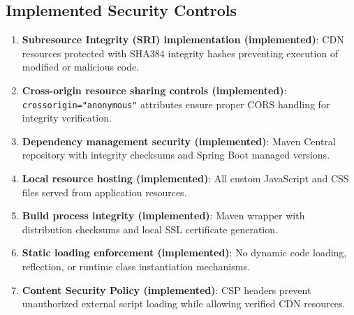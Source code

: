 \documentclass[]{UCD_CS_FYP_Report}
\begin{document}
\subsection{Implemented Security Controls}
\begin{enumerate}
	\item \textbf{Subresource Integrity (SRI) implementation (implemented)}: CDN resources protected with SHA384 integrity hashes preventing execution of modified or malicious code.
	\item \textbf{Cross-origin resource sharing controls (implemented)}: \texttt{crossorigin="anonymous"} attributes ensure proper CORS handling for integrity verification.
	\item \textbf{Dependency management security (implemented)}: Maven Central repository with integrity checksums and Spring Boot managed versions.
	\item \textbf{Local resource hosting (implemented)}: All custom JavaScript and CSS files served from application resources.
	\item \textbf{Build process integrity (implemented)}: Maven wrapper with distribution checksums and local SSL certificate generation.
	\item \textbf{Static loading enforcement (implemented)}: No dynamic code loading, reflection, or runtime class instantiation mechanisms.
	\item \textbf{Content Security Policy (implemented)}: CSP headers prevent unauthorized external script loading while allowing verified CDN resources.
\end{enumerate}
\end{document}
